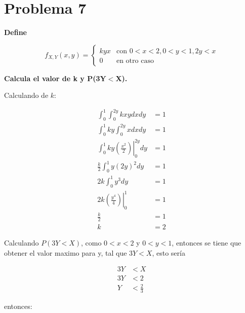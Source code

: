\section*{Problema 7}

\textbf{Define}

\begin{equation*}
    f_{X,Y} (x,y) = \begin{cases}
        kyx & \text{con }0<x<2, 0<y<1, 2y<x \\
        0   & \text{en otro caso}
    \end{cases}
\end{equation*}

\textbf{Calcula el valor de k y P(3Y$<$X).}

Calculando de $k$:

\begin{align*}
    \int_0^1 \int_0^{2y} kxy dxdy                                 & = 1 \\
    \int_0^1 ky \int_0^{2y} xdx dy                                & = 1 \\
    \int_0^1 ky \left.\left(\frac{x^2}{2}\right)\right|_0^{2y} dy & = 1 \\
    \frac{k}{2}\int_0^1 y (2y)^2 dy                               & = 1 \\
    2k\int_0^1 y^3  dy                                            & = 1 \\
    2k \left.\left(\frac{y^4}{4}\right)\right|_0^1                & = 1 \\
    \frac{k}{2}                                                   & =1  \\
    k                                                             & = 2
\end{align*}

Calculando $P(3Y<X)$, como $0<x<2$ y $0<y<1$, entonces se tiene que obtener el valor maximo para y, tal que $3Y<X$, esto sería

\begin{align*}
    3Y & <X            \\
    3Y & <2            \\
    Y  & < \frac{2}{3}
\end{align*}

entonces:

